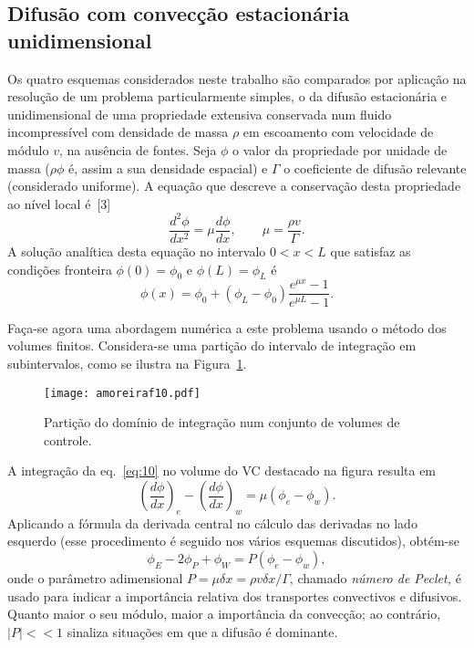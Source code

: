 \documentclass[11pt,twoside]{article}
\begin{document}
{\subsection*{Difusão com convecção estacionária unidimensional}
Os quatro esquemas considerados neste trabalho são comparados por aplicação na
resolução de um problema particularmente simples, o da difusão estacionária e
unidimensional de uma propriedade extensiva conservada num fluido incompressível
com densidade de massa $\rho$ em escoamento com velocidade de módulo $v$, na
ausência de fontes. Seja $\phi$ o valor da propriedade por unidade de massa
($\rho\phi$ é, assim a sua densidade espacial) e $\Gamma$ o coeficiente de
difusão relevante (considerado uniforme). A equação que descreve a conservação
desta propriedade ao nível local é~[3]
\begin{equation}
    \frac{d^2\phi}{dx^2}=\mu\frac{d\phi}{dx}, \qquad \mu=\frac{\rho v}{\Gamma}.
    \label{eq:10}
\end{equation}
A solução analítica desta equação no intervalo $0<x<L$ que satisfaz as condições
fronteira $\phi(0)=\phi_0$ e $\phi(L)=\phi_L$ é
\begin{equation}
    \phi(x) = \phi_0 + (\phi_L-\phi_0)\frac{e^{\mu x}-1}{e^{\mu L}-1}.\label{eq:15}
\end{equation}

Faça-se agora uma abordagem numérica a este problema usando o método dos
volumes finitos. Considera-se uma partição do intervalo de integração em
subintervalos, como se ilustra na Figura~\ref{fig:10}.
\begin{figure}[!h]
\centering
\texttt{[image: amoreiraf10.pdf]}
\caption{Partição do domínio de integração num conjunto de volumes de
controle.\label{fig:10}}
\end{figure}
A integração da eq.~\eqref{eq:10} no volume do VC destacado na figura resulta em
\begin{equation}
    \left(\frac{d\phi}{dx}\right)_e- \left(\frac{d\phi}{dx}\right)_w =
    \mu(\phi_e-\phi_w).
\end{equation}
Aplicando a fórmula da derivada central no cálculo das derivadas no lado esquerdo (esse procedimento é seguido nos vários esquemas discutidos), obtém-se
\begin{equation}
    \phi_E-2\phi_P+\phi_W=P(\phi_e-\phi_w),\label{eq:20}
\end{equation}
onde o parâmetro adimensional $P=\mu\delta x=\rho v\delta x/\Gamma$, chamado
\emph{número de Peclet,} é usado para indicar a importância relativa dos
transportes convectivos e difusivos. Quanto maior o seu módulo, maior a
importância da convecção; ao contrário, $|P|<<1$ sinaliza situações em que a
difusão é dominante.

}
\end{document}
